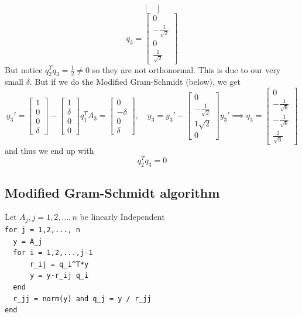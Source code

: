 \documentclass[11pt]{article}
\begin{document}
\begin{example}
\[\begin{bmatrix}
        \end{bmatrix}
    \]
    \[
        q_3 = \begin{bmatrix}
            0 \\ -\frac{1}{\sqrt{2}} \\ 0 \\ \frac{1}{\sqrt{2}}
        \end{bmatrix}
    \]
But notice $q_2^T q_3 = \frac{1}{2} \ne 0$ so they are not orthonormal. This is due to our very small $\delta$.
But if we do the Modified Gram-Schmidt (below), we get 
\[
    y_3' = \begin{bmatrix}
        1 \\ 0 \\ 0 \\ \delta
    \end{bmatrix}-
    \begin{bmatrix}
        1\\ \delta \\ 0 \\ 0
    \end{bmatrix}q^T_1 A_3 = 
    \begin{bmatrix}
        0 \\ -\delta \\ 0 \\ \delta
    \end{bmatrix}, \quad
    y_3 = y_3' - \begin{bmatrix}
        0 \\ - \frac{1}{\sqrt{2}} \\ 1\sqrt{2} \\ 0
    \end{bmatrix}
    y_3' \implies 
    q_3 = \begin{bmatrix}
        0 \\ -\frac{1}{\sqrt{6}} \\ - \frac{1}{\sqrt{6}} \\\frac{2}{\sqrt{6}}
    \end{bmatrix}
\]
and thus we end up with
\[
    q_2^T q_3 = 0
\]
\end{example}

\subsection{Modified Gram-Schmidt algorithm}
Let $A_j, j = 1,2,\dots,n$ be linearly Independent\\
\verb|for j = 1,2,..., n|\\
\verb|  y = A_j|\\
\verb|  for i = 1,2,...,j-1|\\
\verb|      r_ij = q_i^T*y|\\
\verb|      y = y-r_ij q_i|\\
\verb|  end|\\
\verb|  r_jj = norm(y) and q_j = y / r_jj|\\
\verb|end|
\end{document}
